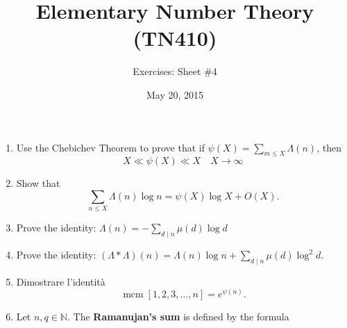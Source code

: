 \documentclass[a4paper,11pt]{article}
\title{Elementary Number Theory (TN410)}
\author{Exercises: Sheet \#4}
\date{May 20, 2015}
\begin{document}
\maketitle
\thispagestyle{empty}

\begin{enumerate}
\item Use the Chebichev Theorem to prove that if $\psi(X)=\sum_{m\le X}\Lambda(n)$, then
$$X\ll \psi(X)\ll X\quad X\rightarrow\infty$$
\item Show that
$$\sum_{n\le X}\Lambda(n)\log n=\psi(X)\log X+O(X).$$
 \item Prove the identity:
$\Lambda(n)=-\sum_{d\mid n}\mu(d)\log d$
\item Prove the identity: $(\Lambda*\Lambda)(n)=\Lambda(n)\log n+\sum_{d\mid n}\mu(d)\log^2d.$
\item Dimostrare l'identit\`a 
$$\operatorname{mcm}[1,2,3,\ldots,n]=e^{\psi(n)}.$$
\item[] Let $n, q\in\mathbb N$. The \textbf{Ramanujan's sum} is defined by the formula


\end{enumerate}
\end{document}
